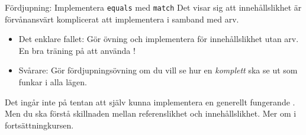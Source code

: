 

\begin{Slide}{Fördjupning: Implementera \texttt{equals} med \texttt{match}}
Det visar sig att innehållslikhet är förvånansvärt komplicerat att implementera i samband med arv.
\begin{itemize}
\item Det enklare fallet: Gör övning  och implementera  för innehållslikhet utan arv. \\ En bra träning på att använda !

\item Svårare: Gör fördjupningsövning  om du vill se hur en \emph{komplett}  ska se ut som funkar i alla lägen.

\end{itemize}

Det ingår inte på tentan att själv kunna implementera en generellt fungerande . Men du ska förstå skillnaden mellan referenslikhet och innehållslikhet. Mer om  i fortsättningkursen.
\end{Slide}











